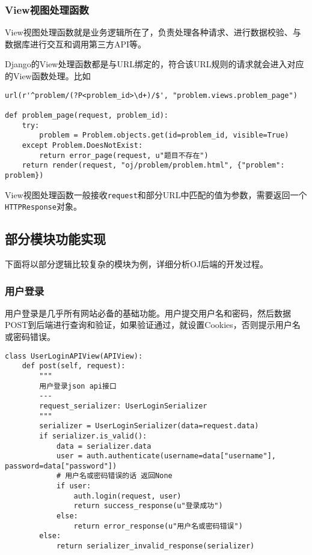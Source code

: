 \subsubsection{View视图处理函数}

View视图处理函数就是业务逻辑所在了，负责处理各种请求、进行数据校验、与数据库进行交互和调用第三方API等。

Django的View处理函数都是与URL绑定的，符合该URL规则的请求就会进入对应的View函数处理。比如

\begin{verbatim}
url(r'^problem/(?P<problem_id>\d+)/$', "problem.views.problem_page")

def problem_page(request, problem_id):
    try:
        problem = Problem.objects.get(id=problem_id, visible=True)
    except Problem.DoesNotExist:
        return error_page(request, u"题目不存在")
    return render(request, "oj/problem/problem.html", {"problem": problem})
\end{verbatim}

View视图处理函数一般接收\texttt{request}和部分URL中匹配的值为参数，需要返回一个\texttt{HTTPResponse}对象。

\subsection{部分模块功能实现}
下面将以部分逻辑比较复杂的模块为例，详细分析OJ后端的开发过程。

\subsubsection{用户登录}
用户登录是几乎所有网站必备的基础功能。用户提交用户名和密码，然后数据POST到后端进行查询和验证，如果验证通过，就设置Cookies，否则提示用户名或密码错误。

\begin{verbatim}
class UserLoginAPIView(APIView):
    def post(self, request):
        """
        用户登录json api接口
        ---
        request_serializer: UserLoginSerializer
        """
        serializer = UserLoginSerializer(data=request.data)
        if serializer.is_valid():
            data = serializer.data
            user = auth.authenticate(username=data["username"], password=data["password"])
            # 用户名或密码错误的话 返回None
            if user:
                auth.login(request, user)
                return success_response(u"登录成功")
            else:
                return error_response(u"用户名或密码错误")
        else:
            return serializer_invalid_response(serializer)
\end{verbatim}

